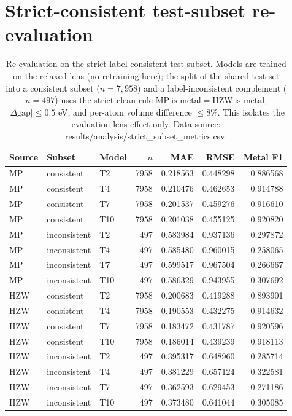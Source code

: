 \documentclass[a4paper,10pt]{article}
\begin{document}
\section{Strict-consistent test-subset re-evaluation}

\begin{table}[htbp]
\centering
\caption{Re-evaluation on the strict label-consistent test subset. Models are trained on the relaxed lens (no retraining here); the split of the shared test set into a consistent subset (\(n=7{,}958\)) and a label-inconsistent complement (\(n=497\)) uses the strict-clean rule \(\mathrm{MP\ is\_metal}=\mathrm{HZW\ is\_metal}\), \(|\Delta\mathrm{gap}|\le 0.5\) eV, and per-atom volume difference \(\le 8\%\). This isolates the evaluation-lens effect only. Data source: \textnormal{results/analysis/strict\_subset\_metrics.csv}.}
\label{tab:strict-subset}
\small
\begin{tabular}{l l l r r r r}
\toprule
Source & Subset & Model & \(n\) & MAE & RMSE & Metal F1 \\
\midrule
MP  & consistent & T2  & 7958 & 0.218563 & 0.448298 & 0.886568 \\
MP  & consistent & T4  & 7958 & 0.210476 & 0.462653 & 0.914788 \\
MP  & consistent & T7  & 7958 & 0.201537 & 0.459276 & 0.916610 \\
MP  & consistent & T10 & 7958 & 0.201038 & 0.455125 & 0.920820 \\
MP  & inconsistent & T2  &  497 & 0.583984 & 0.937136 & 0.297872 \\
MP  & inconsistent & T4  &  497 & 0.585480 & 0.960015 & 0.258065 \\
MP  & inconsistent & T7  &  497 & 0.599517 & 0.967504 & 0.266667 \\
MP  & inconsistent & T10 &  497 & 0.586329 & 0.943955 & 0.307692 \\
\midrule
HZW & consistent & T2  & 7958 & 0.200683 & 0.419288 & 0.893901 \\
HZW & consistent & T4  & 7958 & 0.190553 & 0.432275 & 0.914632 \\
HZW & consistent & T7  & 7958 & 0.183472 & 0.431787 & 0.920596 \\
HZW & consistent & T10 & 7958 & 0.186014 & 0.439239 & 0.918113 \\
HZW & inconsistent & T2  &  497 & 0.395317 & 0.648960 & 0.285714 \\
HZW & inconsistent & T4  &  497 & 0.381229 & 0.657124 & 0.322581 \\
HZW & inconsistent & T7  &  497 & 0.362593 & 0.629453 & 0.271186 \\
HZW & inconsistent & T10 &  497 & 0.373480 & 0.641044 & 0.305085 \\
\bottomrule
\end{tabular}
\end{table}
\end{document}
